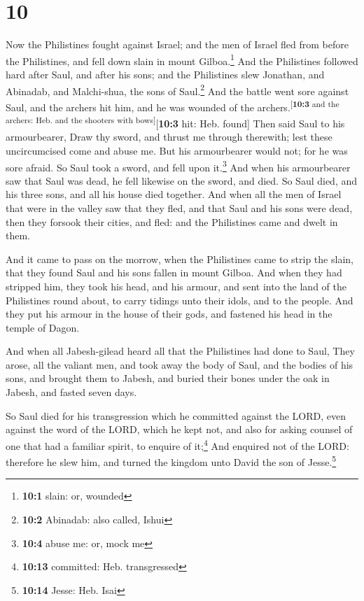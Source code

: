 \hypertarget{section-9}{%
\section{10}\label{section-9}}

 Now the Philistines fought against Israel; and the men of
Israel fled from before the Philistines, and fell down slain in mount
Gilboa.\footnote{\textbf{10:1} slain: or, wounded}  And
the Philistines followed hard after Saul, and after his sons; and the
Philistines slew Jonathan, and Abinadab, and Malchi-shua, the sons of
Saul.\footnote{\textbf{10:2} Abinadab: also called, Ishui}
 And the battle went sore against Saul, and the archers
hit him, and he was wounded of the
archers.\textsuperscript{{[}\textbf{10:3} and the archers: Heb. and the
shooters with bows{]}}{[}\textbf{10:3} hit: Heb. found{]} 
Then said Saul to his armourbearer, Draw thy sword, and thrust me
through therewith; lest these uncircumcised come and abuse me. But his
armourbearer would not; for he was sore afraid. So Saul took a sword,
and fell upon it.\footnote{\textbf{10:4} abuse me: or, mock me}
 And when his armourbearer saw that Saul was dead, he fell
likewise on the sword, and died.  So Saul died, and his
three sons, and all his house died together.  And when all
the men of Israel that were in the valley saw that they fled, and that
Saul and his sons were dead, then they forsook their cities, and fled:
and the Philistines came and dwelt in them.

 And it came to pass on the morrow, when the Philistines
came to strip the slain, that they found Saul and his sons fallen in
mount Gilboa.  And when they had stripped him, they took
his head, and his armour, and sent into the land of the Philistines
round about, to carry tidings unto their idols, and to the people.
 And they put his armour in the house of their gods, and
fastened his head in the temple of Dagon.

 And when all Jabesh-gilead heard all that the
Philistines had done to Saul,  They arose, all the
valiant men, and took away the body of Saul, and the bodies of his sons,
and brought them to Jabesh, and buried their bones under the oak in
Jabesh, and fasted seven days.

 So Saul died for his transgression which he committed
against the LORD, even against the word of the LORD, which he kept not,
and also for asking counsel of one that had a familiar spirit, to
enquire of it;\footnote{\textbf{10:13} committed: Heb. transgressed}
 And enquired not of the LORD: therefore he slew him, and
turned the kingdom unto David the son of Jesse.\footnote{\textbf{10:14}
  Jesse: Heb. Isai}

